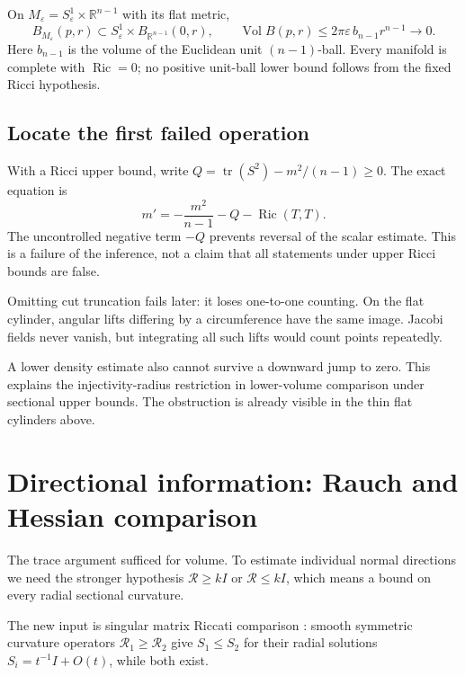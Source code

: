 \documentclass[12pt,reqno]{amsart}
\begin{document}
On \(M_\varepsilon=S^1_\varepsilon\times\mathbb R^{n-1}\) with its flat metric,
\[
B_{M_\varepsilon}(p,r)\subset S^1_\varepsilon\times B_{\mathbb R^{n-1}}(0,r),
\qquad \operatorname{Vol}B(p,r)\le2\pi\varepsilon\,b_{n-1}r^{n-1}\longrightarrow0.
\]
Here \(b_{n-1}\) is the volume of the Euclidean unit \((n-1)\)-ball. Every manifold is complete with \(\operatorname{Ric}=0\); no positive unit-ball lower bound follows from the fixed Ricci hypothesis.

\subsection{Locate the first failed operation}
With a Ricci upper bound, write \(Q=\operatorname{tr}(S^2)-m^2/(n-1)\ge0\). The exact equation is
\[
m'=-\frac{m^2}{n-1}-Q-\operatorname{Ric}(T,T).
\]
The uncontrolled negative term \(-Q\) prevents reversal of the scalar estimate. This is a failure of the inference, not a claim that all statements under upper Ricci bounds are false.

Omitting cut truncation fails later: it loses one-to-one counting. On the flat cylinder, angular lifts differing by a circumference have the same image. Jacobi fields never vanish, but integrating all such lifts would count points repeatedly.

A lower density estimate also cannot survive a downward jump to zero. This explains the injectivity-radius restriction in lower-volume comparison under sectional upper bounds. The obstruction is already visible in the thin flat cylinders above.

\section{Directional information: Rauch and Hessian comparison}
\label{sec:directional}

The trace argument sufficed for volume. To estimate individual normal directions we need the stronger hypothesis \(\mathcal R\ge kI\) or \(\mathcal R\le kI\), which means a bound on every radial sectional curvature.

\begin{samepage}
\begin{theorem}[Rauch]
\label{thm:rauch}

\end{theorem}
\end{samepage}

The new input is singular matrix Riccati comparison \cite[Remark 3.2]{S-Eschenburg-1994}: smooth symmetric curvature operators \(\mathcal R_1\ge\mathcal R_2\) give \(S_1\le S_2\) for their radial solutions \(S_i=t^{-1}I+O(t)\), while both exist.
\end{document}
